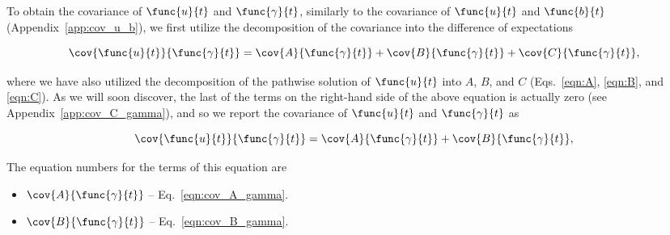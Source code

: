 To obtain the covariance of $\func{u}{t}$ and $\func{\gamma}{t}$, similarly to the covariance of $\func{u}{t}$ and $\func{b}{t}$ (Appendix~\ref{app:cov_u_b}), we first utilize the decomposition of the covariance into the difference of expectations

\begin{equation}
    \cov{\func{u}{t}}{\func{\gamma}{t}} = \cov{A}{\func{\gamma}{t}} + \cov{B}{\func{\gamma}{t}} + \cov{C}{\func{\gamma}{t}},
\end{equation}

where we have also utilized the decomposition of the pathwise solution of $\func{u}{t}$ into $A$, $B$, and $C$ (Eqs.~\ref{eqn:A}, \ref{eqn:B}, and \ref{eqn:C}). As we will soon discover, the last of the terms on the right-hand side of the above equation is actually zero (see Appendix~\ref{app:cov_C_gamma}), and so we report the covariance of $\func{u}{t}$ and $\func{\gamma}{t}$ as 

\begin{equation}
    \cov{\func{u}{t}}{\func{\gamma}{t}} = \cov{A}{\func{\gamma}{t}} + \cov{B}{\func{\gamma}{t}},
    \label{eqn:cov_u_gamma}
\end{equation}

The equation numbers for the terms of this equation are 

\begin{itemize}
	\item [] $\cov{A}{\func{\gamma}{t}}$ -- Eq.~\ref{eqn:cov_A_gamma}.
	\item [] $\cov{B}{\func{\gamma}{t}}$ -- Eq.~\ref{eqn:cov_B_gamma}.
\end{itemize}